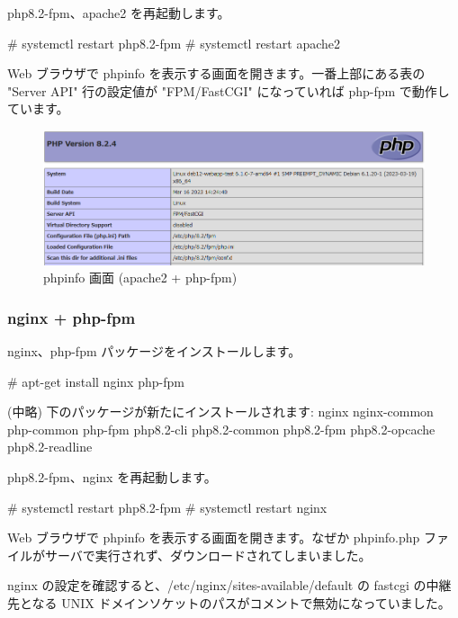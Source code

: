 \documentclass[mingoth,a4paper]{jsarticle}
\begin{document}
php8.2-fpm、apache2 を再起動します。

\begin{commandline}
# systemctl restart php8.2-fpm  
# systemctl restart apache2
\end{commandline}

Web ブラウザで phpinfo を表示する画面を開きます。一番上部にある表の "Server API" 行の設定値が "FPM/FastCGI" になっていれば php-fpm で動作しています。

\begin{center}
  \begin{figure}[htbp]
    \includegraphics[width=1.00\hsize]{image202304/phpinfo_apache2-phpfpm.png}
    \caption{phpinfo 画面 (apache2 + php-fpm)}
  \end{figure}
\end{center}


\subsubsection{nginx + php-fpm}

nginx、php-fpm パッケージをインストールします。

\begin{commandline}
# apt-get install nginx php-fpm

  (中略)
下のパッケージが新たにインストールされます:
  nginx nginx-common php-common php-fpm php8.2-cli php8.2-common php8.2-fpm php8.2-opcache php8.2-readline
\end{commandline}

php8.2-fpm、nginx を再起動します。

\begin{commandline}
# systemctl restart php8.2-fpm  
# systemctl restart nginx
\end{commandline}

Web ブラウザで phpinfo を表示する画面を開きます。なぜか phpinfo.php ファイルがサーバで実行されず、ダウンロードされてしまいました。

nginx の設定を確認すると、/etc/nginx/sites-available/default の fastcgi の中継先となる UNIX ドメインソケットのパスがコメントで無効になっていました。
\end{document}
